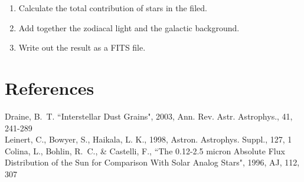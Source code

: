 \documentclass[12pt]{article}
\renewcommand{\i}{\item}
\def\i{\item}
\def\fr{\frac}
\def\fr{\frac}
\begin{document}
\begin{enumerate}
\begin{enumerate}
We assume that all the stars are main sequence with flux scaled to the observed magnitude.
\i Read cross-sections from cross-section file.
\i  Read Hipparcos data.
\i  Convert spectral type into a Castelli model.
\i  Scale the model flux to the magnitude at the Earth and correct for extinction by
the function {\bf CALC\_FLUX}.
$$
\mbox{scale} = 3.64\times 10^{-9} \fr{10^{-0.4(V_{\rm mag} - 3.2  ebv)}}{vflux}\,,
$$
where $ebv$ is $E(B-V)$.
\i Complete for all Hipparcos stars so that they are all read into memory.
\i Begin reading locations from location file and process each location individually.
\i Calculate $x,y,z$ of position and find distance from star. The stellar flux is scaled by
the square of the distance. Assume that the flux is extincted by the distance times the
average density.
\i  Loop over all the Hipparcos stars.
\end{enumerate}
\i Calculate the total contribution of stars in the filed.
\i Add together the zodiacal light and the galactic background.
\i Write out the result as a FITS file.
\end{enumerate}


\section{References}


Draine, B.~T. ``Interstellar Dust Grains", 2003, Ann. Rev. Astr. Astrophys., 41, 241-289\\

Leinert, C., Bowyer, S., Haikala, L. K., 1998, Astron. Astrophys. Suppl., 127, 1 \\

Colina, L., Bohlin, R.~C., \& Castelli, F., ``The 0.12-2.5 micron Absolute Flux Distribution
of the Sun for Comparison With Solar Analog Stars", 1996, AJ, 112, 307
\end{document}
